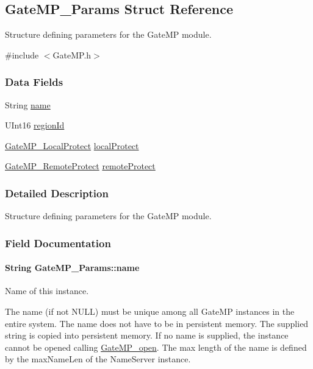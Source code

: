 \subsection{GateMP\_\-Params Struct Reference}
\label{struct_gate_m_p___params}


Structure defining parameters for the GateMP module.  




{\ttfamily \#include $<$GateMP.h$>$}

\subsubsection*{Data Fields}
\begin{DoxyCompactItemize}
\item 
String \hyperlink{struct_gate_m_p___params_a159f61c6e36fe603775dc4840121969b}{name}
\item 
UInt16 \hyperlink{struct_gate_m_p___params_a5af9a96f1fcf6f29b69c07207a33d453}{regionId}
\item 
\hyperlink{_gate_m_p_8h_a3877bd64627d7449d3687e8b06939652}{GateMP\_\-LocalProtect} \hyperlink{struct_gate_m_p___params_ac080433fff177b3d5b1cd5dcafc9e28c}{localProtect}
\item 
\hyperlink{_gate_m_p_8h_a88716d5706d8fa8c6a3b9a4f023ef1d8}{GateMP\_\-RemoteProtect} \hyperlink{struct_gate_m_p___params_a32a1870109d6aa6f583932aff19ebb50}{remoteProtect}
\end{DoxyCompactItemize}


\subsubsection{Detailed Description}
Structure defining parameters for the GateMP module. 

\subsubsection{Field Documentation}
\paragraph[{name}]{\setlength{\rightskip}{0pt plus 5cm}String {\bf GateMP\_\-Params::name}}\hfill\label{struct_gate_m_p___params_a159f61c6e36fe603775dc4840121969b}
Name of this instance.

The name (if not NULL) must be unique among all GateMP instances in the entire system. The name does not have to be in persistent memory. The supplied string is copied into persistent memory. If no name is supplied, the instance cannot be opened calling \hyperlink{_gate_m_p_8h_acefd091d723ca21a0a02e1e1d5600fc8}{GateMP\_\-open}. The max length of the name is defined by the maxNameLen of the NameServer instance. 
